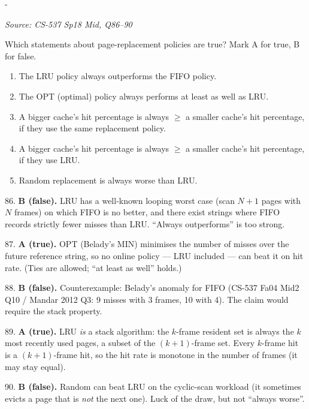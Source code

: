 \documentclass[11pt,a4paper]{article}
\makeatletter
\newcommand{\keepspace}[1]{\par\penalty-100\begingroup
  \setlength{\dimen@}{#1}\dimen@ii\pagegoal\advance\dimen@ii-\pagetotal
  \ifdim\dimen@>\dimen@ii\ifdim\dimen@ii>\z@\vfil\fi\break\fi\endgroup}
\newcounter{qn}[section]
\newenvironment{Qn}[4]{%
  \refstepcounter{qn}\keepspace{7\baselineskip}%
  \begin{tcolorbox}[qboxstyle, title={Q\thesection.\theqn\ \ [#1 \textbar\ #2]\ \ #4}]%
  {\footnotesize\color{g3}\textit{Source: #3}}\par\smallskip%
}{%
  \end{tcolorbox}%
}
\newenvironment{Sol}{%
  \begin{tcolorbox}[sboxstyle, title={Solution}]%
}{%
  \end{tcolorbox}\vspace{0.35em}%
}
\makeatother
\begin{document}
\begin{Qn}{Easy-Medium}{Lect 15}{CS-537 Sp18 Mid, Q86--90}{True/false: OPT, LRU, FIFO, Random, and Belady}
Which statements about page-replacement policies are true? Mark A for
true, B for false.
\begin{enumerate}
  \item[86.] The LRU policy always outperforms the FIFO policy.
  \item[87.] The OPT (optimal) policy always performs at least as well as
        LRU.
  \item[88.] A bigger cache's hit percentage is always $\ge$ a smaller
        cache's hit percentage, if they use the same replacement policy.
  \item[89.] A bigger cache's hit percentage is always $\ge$ a smaller
        cache's hit percentage, if they use LRU.
  \item[90.] Random replacement is always worse than LRU.
\end{enumerate}
\end{Qn}
\begin{Sol}
86. \textbf{B (false).} LRU has a well-known looping worst case (scan
$N+1$ pages with $N$ frames) on which FIFO is no better, and there exist
strings where FIFO records strictly fewer misses than LRU. ``Always
outperforms'' is too strong.

87. \textbf{A (true).} OPT (Belady's MIN) minimises the number of misses
over the future reference string, so no online policy --- LRU included
--- can beat it on hit rate. (Ties are allowed; ``at least as well''
holds.)

88. \textbf{B (false).} Counterexample: Belady's anomaly for FIFO
(CS-537 Fa04 Mid2 Q10 / Mandar 2012 Q3: 9 misses with 3 frames, 10 with
4). The claim would require the stack property.

89. \textbf{A (true).} LRU \emph{is} a stack algorithm: the $k$-frame
resident set is always the $k$ most recently used pages, a subset of
the $(k+1)$-frame set. Every $k$-frame hit is a $(k+1)$-frame hit, so
the hit rate is monotone in the number of frames (it may stay equal).

90. \textbf{B (false).} Random can beat LRU on the cyclic-scan workload
(it sometimes evicts a page that is \emph{not} the next one). Luck of
the draw, but not ``always worse''.
\end{Sol}
\end{document}
